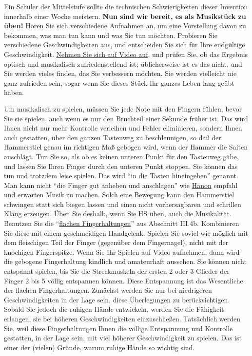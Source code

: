 Ein Schüler der Mittelstufe sollte die technischen Schwierigkeiten dieser Invention innerhalb einer Woche meistern.
\textbf{Nun sind wir bereit, es als Musikstück zu üben!}
Hören Sie sich verschiedene Aufnahmen an, um eine Vorstellung davon zu bekommen, was man tun kann und was Sie tun möchten.
Probieren Sie verschiedene Geschwindigkeiten aus, und entscheiden Sie sich für Ihre endgültige Geschwindigkeit.
\hyperlink{c1iii13}{Nehmen Sie sich auf Video auf}, und prüfen Sie, ob das Ergebnis optisch und musikalisch zufriedenstellend ist; üblicherweise ist es das nicht, und Sie werden vieles finden, das Sie verbessern möchten. Sie werden vielleicht nie ganz zufrieden sein, sogar wenn Sie dieses Stück Ihr ganzes Leben lang geübt haben.

Um musikalisch zu spielen, müssen Sie jede Note mit den Fingern fühlen, bevor Sie sie spielen, auch wenn es nur den Bruchteil einer Sekunde früher ist.
Das wird Ihnen nicht nur mehr Kontrolle verleihen und Fehler eliminieren, sondern Ihnen auch gestatten, über den ganzen Tastenweg zu beschleunigen, so daß der Hammerstiel genau im richtigen Maß gebogen wird, wenn der Hammer die Saiten anschlägt.
Tun Sie so, als ob es keinen unteren Punkt für den Tastenweg gäbe, und lassen Sie Ihren Finger durch den unteren Punkt stoppen.
Sie können das tun und trotzdem leise spielen.
Das wird \enquote{in die Tasten hineingehen} genannt.
Man kann nicht \enquote{die Finger gut anheben und anschlagen} wie \hyperlink{c1iii7h}{Hanon} empfahl und erwarten Musik zu machen.
Solch eine Bewegung kann den Hammerstiel schwingen statt sich biegen lassen und einen nicht vorhersagbaren und schrillen Klang erzeugen.
Üben Sie deshalb, wenn Sie HS üben, auch die Musikalität.
Benutzen Sie die \enquote{\hyperlink{c1iii4b}{flachen Fingerhaltungen}} aus Abschnitt III.4b.
Kombinieren Sie diese mit einem geschmeidigen Handgelenk.
Spielen Sie soviel wie möglich mit dem fleischigen Teil der Finger (gegenüber dem Fingernagel), nicht mit der knochigen Fingerspitze.
Wenn Sie Ihr Spielen auf Video aufnehmen, dann wird die gebogene Fingerhaltung kindlich und amateurhaft aussehen.
Sie können nicht entspannt spielen, bis Sie die Streckmuskeln der ersten 2 oder 3 Glieder der Finger 2 bis 5 völlig entspannen können.
Diese Entspannung ist das Wesentliche der flachen Fingerhaltungen.
Zunächst werden Sie nur bei niedrigeren Geschwindigkeiten in der Lage sein, diese Überlegungen zu berücksichtigen.
Sobald Sie jedoch die ruhigen Hände entwickeln, werden Sie die Fähigkeit erlangen, sie bei höheren Geschwindigkeiten einzuschließen.
Tatsächlich werden Sie, weil diese Fingerhaltungen Ihnen die völlige Entspannung und Kontrolle gestatten, in der Lage sein, mit viel höherer Geschwindigkeit zu spielen.
Das ist einer der (vielen) Gründe, warum ruhige Hände so wichtig sind.


